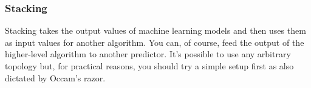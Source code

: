 \subsubsection*{Stacking}
Stacking takes the output values of machine learning models and then uses them as input values for another algorithm. You can, of course, feed the output of the higher-level algorithm to another predictor. It's possible to use any arbitrary topology but, for practical reasons, you should try a simple setup first as also dictated by Occam's razor.